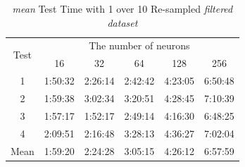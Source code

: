\documentclass[draft,dvipsnames]{drexel-thesis}
\begin{document}
\begin{thesis}
\begin{table}[!t]
\centering
\caption{{\em mean} Test Time with 1 over 10 Re-sampled {\em filtered dataset}}
\label{tbl:mean_1_10_time}
\begin{tabular}{|c|c|c|c|c|c|}
\hline
\multirow{2}{*}{Test}      & \multicolumn{5}{c|}{The number of neurons}                                                                                                               \\ \cline{2-6}
                           & 16                           & 32                           & 64                           & 128                          & 256                          \\ \hline
1                          & 1:50:32                      & 2:26:14                      & 2:42:42                      & 4:23:05                      & 6:50:48                      \\ \hline
2                          & 1:59:38                      & 3:02:34                      & 3:20:51                      & 4:28:45                      & 7:10:39                      \\ \hline
3                          & 1:57:17                      & 1:52:17                      & 2:49:14                      & 4:16:30                      & 6:48:25                      \\ \hline
4                          & 2:09:51                      & 2:16:48                      & 3:28:13                      & 4:36:27                      & 7:02:04                      \\ \hline
\multicolumn{1}{|l|}{Mean} & \multicolumn{1}{l|}{1:59:20} & \multicolumn{1}{l|}{2:24:28} & \multicolumn{1}{l|}{3:05:15} & \multicolumn{1}{l|}{4:26:12} & \multicolumn{1}{l|}{6:57:59} \\ \hline
\end{tabular}
\end{table}


\end{thesis}
\end{document}
